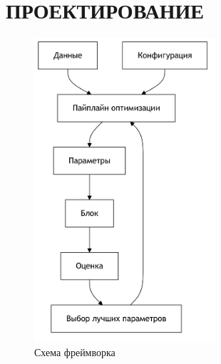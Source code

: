\documentclass[14pt,a4paper,oneside,openany]{extbook}
\begin{document}
\chapter{ПРОЕКТИРОВАНИЕ}
\label{sec:org1b8040a}

\begin{figure}[h]
\centering
\includegraphics[width=0.6\textwidth,height=0.5\textheight]{img/mermaid/framework_schema.png}
\caption{\label{fig:framework_schema}Схема фреймворка}
\end{figure}
\end{document}
